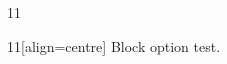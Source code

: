 \documentclass[paper=A4]{ropas-poster}
\begin{document}
\begin{postergrid}{1}{1}
\begin{posterblock}{1}{1}[align=centre]
Block option test.
\end{posterblock}
\end{postergrid}
\end{document}
